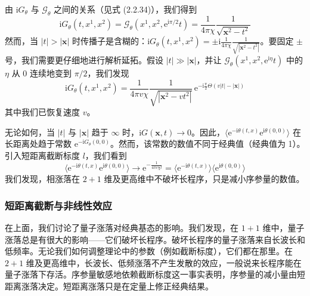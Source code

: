 由 $\mathrm{i}G_{\theta}$ 与 $\mathcal{G}_{\theta}$ 之间的关系（见式 (2.2.34)），我们得到
\begin{equation*}
\mathrm{i}G_{\theta}(t,x^1,x^2)=\mathcal{G}_{\theta}(x^1,x^2,\mathrm{e}^{\mathrm{i}\pi/2}t)=\frac{1}{4\pi\chi}\frac{1}{\sqrt{\pmb{x}^2-t^2}}
\end{equation*}
然而，当 $|t|>|\pmb{x}|$ 时传播子是含糊的：$\mathrm{i}G_{\theta}(t,x^1,x^2)=\pm\mathrm{i}\frac{1}{4\pi\chi}\frac{1}{\sqrt{|\pmb{x}^2-t^2|}}$。要固定 $\pm$ 号，我们需要更仔细地进行解析延拓。假设 $|t|\gg|\pmb{x}|$，并让 $\mathcal{G}_{\theta}(x^1,x^2,\mathrm{e}^{\mathrm{i}\eta}t)$ 中的 $\eta$ 从 0 连续地变到 $\pi/2$，我们发现
\begin{equation*}
\mathrm{i}G_{\theta}(t,x^1,x^2)=\frac{1}{4\pi v\chi}\frac{1}{\sqrt{|\pmb{x}^2-vt^2|}}\,\mathrm{e}^{-\mathrm{i}\frac{\pi}{2}\Theta(v|t|-|\pmb{x}|)}
\end{equation*}
其中我们已恢复速度 $v$。

无论如何，当 $|t|$ 与 $|\pmb{x}|$ 趋于 $\infty$ 时，$\mathrm{i}G(\pmb{x},t)\to 0$。因此，$\langle\mathrm{e}^{-\mathrm{i}\theta(t,x)}\mathrm{e}^{\mathrm{i}\theta(0,0)}\rangle$ 在长距离处趋于常数 $\mathrm{e}^{-\mathrm{i}G_{\theta}(0,0)}$。然而，该常数的数值不同于经典值（经典值为 1）。引入短距离截断标度 $l$，我们看到
\begin{equation*}
\big\langle\mathrm{e}^{-\mathrm{i}\theta(t,x)}\mathrm{e}^{\mathrm{i}\theta(0,0)}\big\rangle\to\mathrm{e}^{-\frac{1}{4\pi v\chi l}}=\big\langle\mathrm{e}^{-\mathrm{i}\theta(t,x)}\big\rangle\big\langle\mathrm{e}^{\mathrm{i}\theta(0,0)}\big\rangle \tag{3.3.26}
\end{equation*}
我们发现，相涨落在 $2+1$ 维及更高维中不破坏长程序，只是减小序参量的数值。

\subsubsection{短距离截断与非线性效应}

在上面，我们讨论了量子涨落对经典基态的影响。我们发现，在 $1+1$ 维中，量子涨落总是有很大的影响——它们破坏长程序。破坏长程序的量子涨落来自长波长和低频率。无论我们如何调整理论中的参数（例如截断标度），它们都在那里。在 $2+1$ 维及更高维中，长波长、低频涨落不产生发散的效应，一般说来长程序能在量子涨落下存活。序参量敏感地依赖截断标度这一事实表明，序参量的减小量由短距离涨落决定。短距离涨落只是在定量上修正经典结果。

